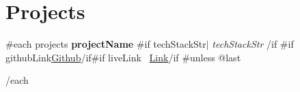 \section{Projects}
    \vspace{-5pt}
    \resumeSubHeadingListStart


    {{#each projects}}
        \resumeProjectHeading
          {\textbf{ {{projectName}} } {{#if techStackStr}}$|$ \emph{ {{techStackStr}} }{{/if}} }{ {{#if githubLink}}\href{ {{githubLink}} }{Github}{{/if}}{{#if liveLink}} \textbar\ \href{ {{liveLink}} }{Link}{{/if}} }
          \resumeItemListStart
          \resumeItemListEnd
          {{#unless @last}}

    {{/each}}
    
    \resumeSubHeadingListEnd
\vspace{-15pt}
